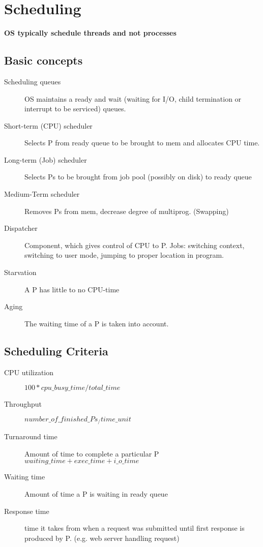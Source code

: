 \section*{Scheduling}
\textbf{OS typically schedule threads and not processes}
\subsection*{Basic concepts}
\begin{description}
  \item[Scheduling queues] OS maintains a ready and wait (waiting for I/O, child termination or interrupt to be serviced) queues.
  \item[Short-term (CPU) scheduler] Selects P from ready queue to be brought to mem and allocates CPU time.
  \item[Long-term (Job) scheduler] Selects Ps to be brought from job pool (possibly on disk) to ready queue
  \item[Medium-Term scheduler] Removes Ps from mem, decrease degree of multiprog. (Swapping)
  \item[Dispatcher] Component, which gives control of CPU to P. Jobs: switching context, switching to user mode, jumping to proper location in program.
  \item[Starvation] A P has little to no CPU-time
  \item[Aging] The waiting time of a P is taken into account.
\end{description}

\subsection*{Scheduling Criteria}
\begin{description}
  \item[CPU utilization] $100 * cpu\_busy\_time / total\_time$
  \item[Throughput] $number\_of\_finished\_Ps_/time\_unit$
  \item[Turnaround time] Amount of time to complete a particular P $waiting\_time+exec\_time+i\_o\_time$
  \item[Waiting time] Amount of time a P is waiting in ready queue
  \item[Response time] time it takes from when a request was submitted until first response is produced by P. (e.g. web server handling request)
\end{description}

